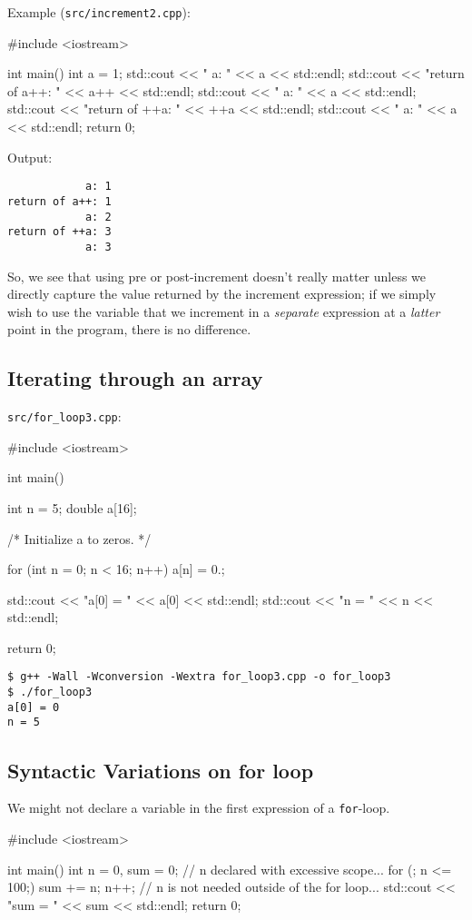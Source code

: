 \documentclass[12pt,letterpaper,twoside]{article}
\begin{document}
Example (\texttt{src/increment2.cpp}):

\begin{cpp}
#include <iostream>

int main() {
  int a = 1;
  std::cout << "            a: " << a   << std::endl;
  std::cout << "return of a++: " << a++ << std::endl;
  std::cout << "            a: " << a   << std::endl;
  std::cout << "return of ++a: " << ++a << std::endl;
  std::cout << "            a: " << a   << std::endl;
  return 0;
}
\end{cpp}

Output:

\begin{verbatim}
            a: 1
return of a++: 1
            a: 2
return of ++a: 3
            a: 3
\end{verbatim}

So, we see that using pre or post-increment doesn't really matter
unless we directly capture the value returned by the increment
expression; if we simply wish to use the variable that we increment in
a \emph{separate} expression at a \emph{latter} point in the program,
there is no difference.

\subsection{Iterating through an array}
\texttt{src/for\_loop3.cpp}:

\begin{cpp}
#include <iostream>

int main() {
  int n = 5;
  double a[16];

  /* Initialize a to zeros. */

  for (int n = 0; n < 16; n++) {
    a[n] = 0.;
  }

  std::cout << "a[0] = " << a[0] << std::endl;
  std::cout << "n = " << n << std::endl;

  return 0;
}
\end{cpp}

\begin{verbatim}
$ g++ -Wall -Wconversion -Wextra for_loop3.cpp -o for_loop3
$ ./for_loop3
a[0] = 0
n = 5
\end{verbatim}

\vspace{-2ex}
\subsection{Syntactic Variations on for loop}
We might not declare a variable in the first expression of a
\texttt{for}-loop.
\begin{cpp}
#include <iostream>

int main() {
  int n = 0, sum = 0;   // n declared with excessive scope...
  for (; n <= 100;) {
    sum += n;
    n++;
  }                     // n is not needed outside of the for loop...
  std::cout << "sum = " << sum << std::endl;
  return 0;
}
\end{cpp}
\end{document}
